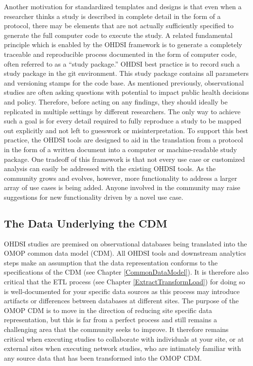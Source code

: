 \documentclass[11pt]{book}
\theoremstyle{definition}
\theoremstyle{definition}
\theoremstyle{definition}
\theoremstyle{remark}
\begin{document}
Another motivation for standardized templates and designs is that even
when a researcher thinks a study is described in complete detail in the
form of a protocol, there may be elements that are not actually
sufficiently specified to generate the full computer code to execute the
study. A related fundamental principle which is enabled by the OHDSI
framework is to generate a completely traceable and reproducible process
documented in the form of computer code, often referred to as a ``study
package.'' OHDSI best practice is to record such a study package in the
git environment. This study package contains all parameters and
versioning stamps for the code base. As mentioned previously,
observational studies are often asking questions with potential to
impact public health decisions and policy. Therefore, before acting on
any findings, they should ideally be replicated in multiple settings by
different researchers. The only way to achieve such a goal is for every
detail required to fully reproduce a study to be mapped out explicitly
and not left to guesswork or misinterpretation. To support this best
practice, the OHDSI tools are designed to aid in the translation from a
protocol in the form of a written document into a computer or
machine-readable study package. One tradeoff of this framework is that
not every use case or customized analysis can easily be addressed with
the existing OHDSI tools. As the community grows and evolves, however,
more functionality to address a larger array of use cases is being
added. Anyone involved in the community may raise suggestions for new
functionality driven by a novel use case.

\subsection{The Data Underlying the
CDM}\label{the-data-underlying-the-cdm}

OHDSI studies are premised on observational databases being translated
into the OMOP common data model (CDM). All OHDSI tools and downstream
analytics steps make an assumption that the data representation conforms
to the specifications of the CDM (see Chapter \ref{CommonDataModel}). It
is therefore also critical that the ETL process (see Chapter
\ref{ExtractTransformLoad}) for doing so is well-documented for your
specific data sources as this process may introduce artifacts or
differences between databases at different sites. The purpose of the
OMOP CDM is to move in the direction of reducing site specific data
representation, but this is far from a perfect process and still remains
a challenging area that the community seeks to improve. It therefore
remains critical when executing studies to collaborate with individuals
at your site, or at external sites when executing network studies, who
are intimately familiar with any source data that has been transformed
into the OMOP CDM.
\end{document}
